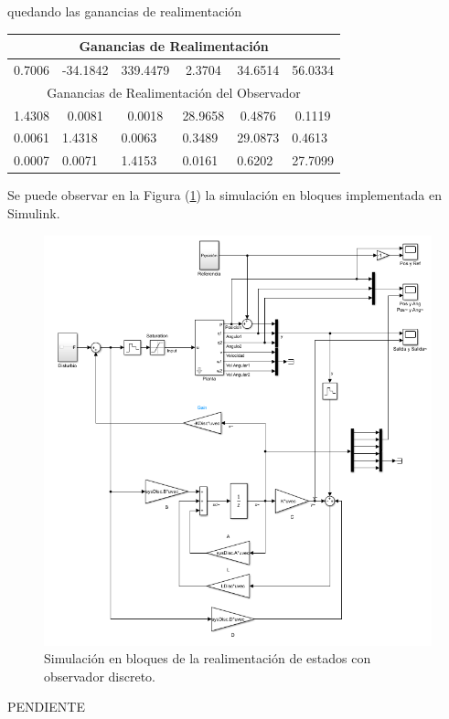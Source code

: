 quedando las ganancias de realimentación

\begin{table}[H]
\centering
\begin{tabular}{@{}clllll@{}}
\toprule
\multicolumn{6}{c}{Ganancias de Realimentación}                           \\ \midrule
0.7006 & \multicolumn{1}{c}{-34.1842} & \multicolumn{1}{c}{339.4479} & \multicolumn{1}{c}{2.3704}  & \multicolumn{1}{c}{34.6514} & \multicolumn{1}{c}{56.0334} \\ \midrule
\multicolumn{6}{c}{Ganancias de Realimentación del Observador}            \\ \midrule
1.4308 & \multicolumn{1}{c}{0.0081}   & \multicolumn{1}{c}{0.0018}   & \multicolumn{1}{c}{28.9658} & \multicolumn{1}{c}{0.4876}  & \multicolumn{1}{c}{0.1119}  \\
\multicolumn{1}{l}{0.0061} & 1.4318 & 0.0063 & 0.3489 & 29.0873 & 0.4613  \\
\multicolumn{1}{l}{0.0007} & 0.0071 & 1.4153 & 0.0161 & 0.6202  & 27.7099 \\ \bottomrule
\end{tabular}
\end{table}

Se puede observar en la Figura (\ref{fig:obsv_disc}) la simulación en bloques implementada en Simulink.

\begin{figure}[H]
	\centering
	\includegraphics[width=\linewidth]{../Modelo de Control/ImagenesModelo de Control/obsv_disc.png}
	\caption{Simulación en bloques de la realimentación de estados con observador discreto.}	
	\label{fig:obsv_disc}
\end{figure}


PENDIENTE

%